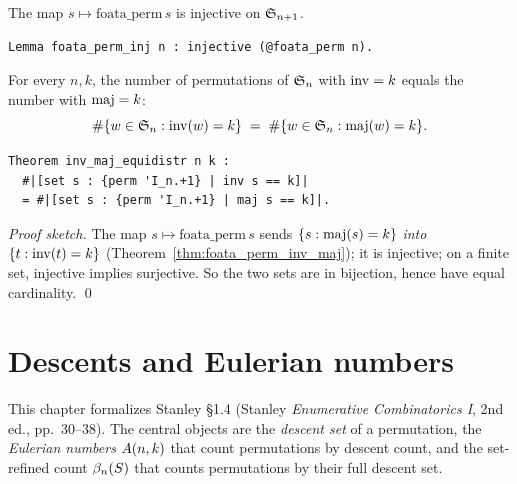 
\begin{lemma}
  The map $s \mapsto \mathrm{foata\_perm}\,s$ is injective on
  $\mathfrak{S}_{n+1}$.
\end{lemma}

\begin{lstlisting}[language=Rocq]
Lemma foata_perm_inj n : injective (@foata_perm n).
\end{lstlisting}


\begin{theorem}
  \label{thm:inv_maj_equidistr}
  For every $n, k$, the number of permutations of $\mathfrak{S}_{n}$ with
  $\mathrm{inv} = k$ equals the number with $\mathrm{maj} = k$:
  \[
    \#\{w \in \mathfrak{S}_{n} : \mathrm{inv}(w) = k\}
    \;=\;
    \#\{w \in \mathfrak{S}_{n} : \mathrm{maj}(w) = k\}.
  \]
\end{theorem}

\begin{lstlisting}[language=Rocq]
Theorem inv_maj_equidistr n k :
  #|[set s : {perm 'I_n.+1} | inv s == k]|
  = #|[set s : {perm 'I_n.+1} | maj s == k]|.
\end{lstlisting}


\noindent
\emph{Proof sketch.} The map $s \mapsto \mathrm{foata\_perm}\,s$
sends $\{s : \mathrm{maj}(s) = k\}$ \emph{into} $\{t : \mathrm{inv}(t) = k\}$
(Theorem~\ref{thm:foata_perm_inv_maj}); it is injective; on a
finite set, injective implies surjective. So the two sets are in
bijection, hence have equal cardinality. \qed

\clearpage

\chapter{Descents and Eulerian numbers}
\label{ch:descents}

This chapter formalizes Stanley \S1.4 (Stanley
\emph{Enumerative Combinatorics I}, 2nd ed., pp.~30--38). The central
objects are the \emph{descent set} of a permutation, the
\emph{Eulerian numbers} $A(n, k)$ that count permutations by
descent count, and the set-refined count $\beta_{n}(S)$ that counts
permutations by their full descent set.

